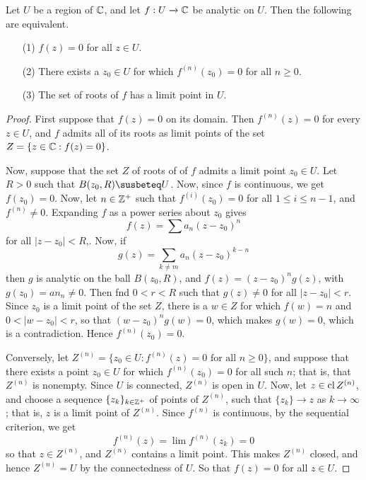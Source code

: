 \begin{theorem}\label{4.4.4}
    Let $U$ be a region of  $\mathbb{C}$, and let  $f:U \xrightarrow{} \mathbb{C}$ be analytic
    on $U$. Then the following are equivalent.
    \begin{enumerate}
        \item[(1)] $f(z)=0$ for all $z \in U$.

        \item[(2)] There exists a $z_0 \in U$ for which $f^{(n)}(z_0)=0$ for all
            $n \geq 0$.

        \item[(3)] The set of roots of $f$ has a limit point in  $U$.
    \end{enumerate}
\end{theorem}
\begin{proof}
    First suppose that $f(z)=0$ on its domain. Then $f^{(n)}(z)=0$ for every $z
    \in U$, and  $f$ admits all of its roots as limit points of the set  $Z=\{z
    \in \mathbb{C} : f(z)=0\}$.

    Now, suppose that the set $Z$ of roots of of $f$ admits a limit point $z_0
    \in U$. Let $R>0$ such that  $B(z_0,R) \susbeteq U$. Now, since $f$ is
    continuous, we get  $f(z_0)=0$. Now, let $n \in \mathbb{Z}^+$ such that
    $f^{(i)}(z_0)=0$ for all $1 \leq i \leq n-1$, and  $f^{(n)} \neq 0$.
    Expanding $f$ as a power series about $z_0$ gives
    \begin{equation*}
        f(z)=\sum{a_n(z-z_0)^n}
    \end{equation*}
    for all $|z-z_0|<R$,. Now, if
    \begin{equation*}
        g(z)=\sum_{k \neq m}{a_n(z-z_0)^{k-n}}
    \end{equation*}
    then $g$ is analytic on the ball  $B(z_0,R)$, and $f(z)=(z-z_0)^ng(z)$, with
    $g(z_0)=an_n \neq 0$. Then fnd $0<r<R$ such that  $g(z) \neq 0$ for all
    $|z-z_0|<r$. Since $z_0$ is a limit point of the set $Z$, there is a $w \in
    Z$ for which $f(w)=n$ and $0<|w-z_0|<r$, so that $(w-z_0)^ng(w)=0$, which
    makes $g(w)=0$, which is a contradiction. Hence $f^{(n)}(z_0)=0$.

    Conversely, let $Z^{(n)}=\{z_0 \in U : f^{(n)}(z)=0 \text{ for all } n \geq
    0\}$, and suppose that there exists a point $z_0 \in U$ for which
    $f^{(n)}(z_0)=0$ for all such $n$; that is, that  $Z^{(n)}$ is nonempty.
    Since $U$ is connected,  $Z^{(n)}$ is open in $U$. Now, let  $z \in
    \operatorname{cl}{Z^{(n)}}$, and choose a sequence $\{z_k\}_{k \in \mathbb{Z}^+}$ of points of
    $Z^{(n)}$, such that $\{z_k\} \xrightarrow{} z$ as $k \xrightarrow{}
    \infty$; that is, $z$ is a limit point of  $Z^{(n)}$. Since $f^{(n)}$ is
    continuous, by the sequential criterion, we get
    \begin{equation*}
        f^{(n)}(z)=\lim{f^{(n)}(z_k)}=0
    \end{equation*}
    so that $z \in Z^{(n)}$, and $Z^{(n)}$ contains a limit point. This makes
    $Z^{(n)}$ closed, and hence $Z^{(n)}=U$ by the connectedness of $U$. So that
     $f(z)=0$ for all $z \in U$.
\end{proof}
